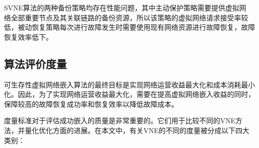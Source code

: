 SVNE算法的两种备份策略均存在性能问题，其中主动保护策略需要提供虚拟网 络全部重要节点及其关联链路的备份资源，所以该策略的虚拟网络请求接受率较 低，被动恢复策略每次进行故障发生时需要使用现有网络资源进行故障恢复，故障恢复效率低下。

\subsection{算法评价度量}
可生存性虚拟网络嵌入算法的最终目标是实现网络运营收益最大化和成本消耗最小化。因此，为了实现网络运营收益最大化，需要在提高虚拟网络嵌入收益的同时，保障较高的故障恢复成功率和恢复效率以降低故障成本。

度量标准对于评估成功嵌入的质量是非常重要的。它们用于比较不同的VNE方法，并量化优化方面的进展。在本文中，有关VNE的不同的度量被分成以下四大类别：

